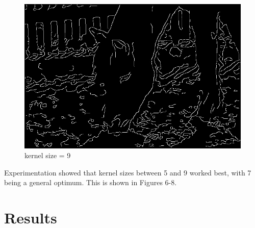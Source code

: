 \documentclass[11pt]{article}
\begin{document}
\begin{figure}
  \includegraphics[width=\linewidth]{figures/white_horse_ksize=9.jpg}
  \caption{kernel size = 9}
\end{figure}

Experimentation showed that kernel sizes between 5 and 9 worked best, with 7 being a general optimum.
This is shown in Figures 6-8.

\section{Results}
\end{document}
